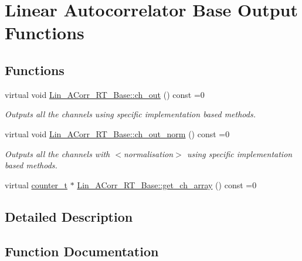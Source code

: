 \hypertarget{group__Lin__ACorr__Base__Out}{}\section{\textquotesingle{}\textquotesingle{}Linear Autocorrelator Base Output Functions\textquotesingle{}\textquotesingle{}}
\label{group__Lin__ACorr__Base__Out}
\subsection*{Functions}
\begin{DoxyCompactItemize}
\item 
virtual void \hyperlink{group__Lin__ACorr__Base__Out_ga4fe3bd7a6a98388d46827d22dc4596c9}{Lin\+\_\+\+A\+Corr\+\_\+\+R\+T\+\_\+\+Base\+::ch\+\_\+out} () const =0
\begin{DoxyCompactList}\small\item\em Outputs all the channels using specific implementation based methods. \end{DoxyCompactList}\item 
virtual void \hyperlink{group__Lin__ACorr__Base__Out_ga3e58cb03c3a93107758d506c53cf2461}{Lin\+\_\+\+A\+Corr\+\_\+\+R\+T\+\_\+\+Base\+::ch\+\_\+out\+\_\+norm} () const =0
\begin{DoxyCompactList}\small\item\em Outputs all the channels with {\bfseries } $<$normalisation$>$ using specific implementation based methods. \end{DoxyCompactList}\item 
virtual \hyperlink{types_8hpp_ac89ac912f524b3e3fa3720ea55fec966}{counter\+\_\+t} $\ast$ \hyperlink{group__Lin__ACorr__Base__Out_gafb6585805776a54d5e4f120cfd1fea9e}{Lin\+\_\+\+A\+Corr\+\_\+\+R\+T\+\_\+\+Base\+::get\+\_\+ch\+\_\+array} () const =0
\end{DoxyCompactItemize}


\subsection{Detailed Description}


\subsection{Function Documentation}
\mbox{\label{group__Lin__ACorr__Base__Out_ga4fe3bd7a6a98388d46827d22dc4596c9}} 
